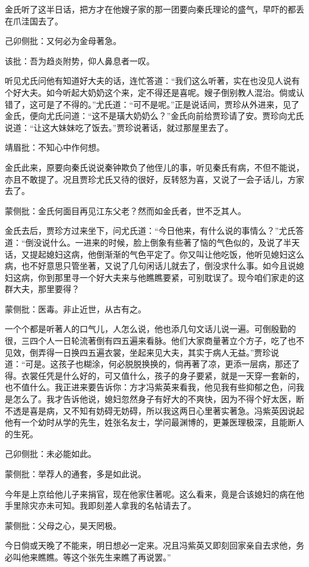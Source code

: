 \begin{parag}


    金氏听了这半日话，把方才在他嫂子家的那一团要向秦氏理论的盛气，早吓的都丢在爪洼国去了。\begin{note}己卯侧批：又何必为金母著急。\end{note}\begin{note}该批：吾为趋炎附势，仰人鼻息者一叹。\end{note}听见尤氏问他有知道好大夫的话，连忙答道：“我们这么听著，实在也没见人说有个好大夫。如今听起大奶奶这个来，定不得还是喜呢。嫂子倒别教人混治。倘或认错了，这可是了不得的。”尤氏道：“可不是呢。”正是说话间，贾珍从外进来，见了金氏，便向尤氏问道：“这不是璜大奶奶么？”金氏向前给贾珍请了安。贾珍向尤氏说道：“让这大妹妹吃了饭去。”贾珍说著话，就过那屋里去了。\begin{note}靖眉批：不知心中作何想。\end{note}金氏此来，原要向秦氏说说秦钟欺负了他侄儿的事，听见秦氏有病，不但不能说，亦且不敢提了。况且贾珍尤氏又待的很好，反转怒为喜，又说了一会子话儿，方家去了。\begin{note}蒙侧批：金氏何面目再见江东父老？然而如金氏者，世不乏其人。\end{note}
\end{parag}


\begin{parag}


    金氏去后，贾珍方过来坐下，问尤氏道：“今日他来，有什么说的事情么？”尤氏答道：“倒没说什么。一进来的时候，脸上倒象有些著了恼的气色似的，及说了半天话，又提起媳妇这病，他倒渐渐的气色平定了。你又叫让他吃饭，他听见媳妇这么病，也不好意思只管坐著，又说了几句闲话儿就去了，倒没求什么事。如今且说媳妇这病，你到那里寻一个好大夫来与他瞧瞧要紧，可别耽误了。现今咱们家走的这群大夫，那里要得？\begin{note}蒙侧批：医毒。非止近世，从古有之。\end{note}一个个都是听著人的口气儿，人怎么说，他也添几句文话儿说一遍。可倒殷勤的很，三四个人一日轮流著倒有四五遍来看脉。他们大家商量著立个方子，吃了也不见效，倒弄得一日换四五遍衣裳，坐起来见大夫，其实于病人无益。”贾珍说道：“可是。这孩子也糊涂，何必脱脱换换的，倘再著了凉，更添一层病，那还了得。衣裳任凭是什么好的，可又值什么，孩子的身子要紧，就是一天穿一套新的，也不值什么。我正进来要告诉你：方才冯紫英来看我，他见我有些抑郁之色，问我是怎么了。我才告诉他说，媳妇忽然身子有好大的不爽快，因为不得个好太医，断不透是喜是病，又不知有妨碍无妨碍，所以我这两日心里著实著急。冯紫英因说起他有一个幼时从学的先生，姓张名友士，学问最渊博的，更兼医理极深，且能断人的生死。\begin{note}己卯侧批：未必能如此。\end{note}\begin{note}蒙侧批：举荐人的通套，多是如此说。\end{note}今年是上京给他儿子来捐官，现在他家住著呢。这么看来，竟是合该媳妇的病在他手里除灾亦未可知。我即刻差人拿我的名帖请去了。\begin{note}蒙侧批：父母之心，昊天罔极。\end{note}今日倘或天晚了不能来，明日想必一定来。况且冯紫英又即刻回家亲自去求他，务必叫他来瞧瞧。等这个张先生来瞧了再说罢。”
\end{parag}


